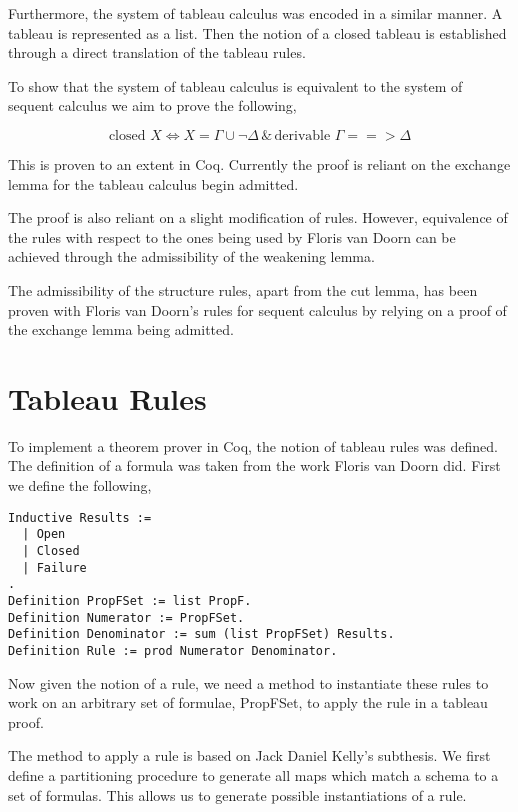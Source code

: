 \documentclass{report}
\theoremstyle{definition}
\begin{document}
Furthermore, the system of tableau calculus was encoded in a similar manner.
A tableau is represented as a list. Then the notion of a closed tableau is
established through a direct translation of the tableau rules.

To show that the system of tableau calculus is equivalent to the system of
sequent calculus we aim to prove the following,

\begin{equation}
\text{closed }X \iff X=\Gamma \cup \neg \Delta \, \& \, \text{derivable }
\Gamma ==> \Delta
\label{tableau sequent equivalence}
\end{equation}

This is proven to an extent in Coq. Currently the proof is reliant on the
exchange lemma for the tableau calculus begin admitted.

The proof is also reliant on a slight modification of rules. However,
equivalence of the rules with respect to the ones being used by Floris van
Doorn can be achieved through the admissibility of the weakening lemma.

The admissibility of the structure rules, apart from the cut lemma, has been
proven with Floris van Doorn's rules for sequent calculus by relying on a
proof of the exchange lemma being admitted.

\section{Tableau Rules}

To implement a theorem prover in Coq, the notion of tableau rules was defined.
The definition of a formula was taken from the work Floris van Doorn did.
First we define the following,

\begin{lstlisting}
Inductive Results :=
  | Open
  | Closed
  | Failure
.
Definition PropFSet := list PropF.
Definition Numerator := PropFSet.
Definition Denominator := sum (list PropFSet) Results.
Definition Rule := prod Numerator Denominator.
\end{lstlisting}

Now given the notion of a rule, we need a method to instantiate these rules to
work on an arbitrary set of formulae, PropFSet, to apply the rule in a tableau
proof.

The method to apply a rule is based on Jack Daniel Kelly's subthesis. We first
define a partitioning procedure to generate all maps which match a schema to
a set of formulas. This allows us to generate possible instantiations of a
rule.
\end{document}
